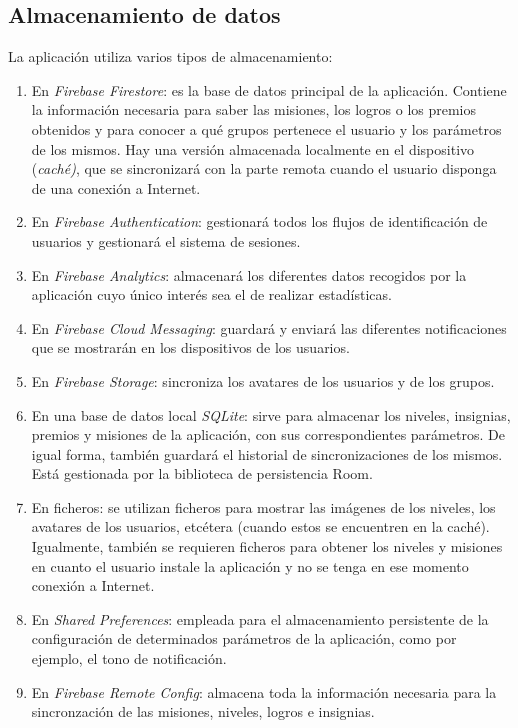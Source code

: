 \documentclass[twoside]{report}
\begin{document}

\subsection{Almacenamiento de datos}

La aplicación utiliza varios tipos de almacenamiento:
\begin{enumerate}
\item En \textit{Firebase Firestore}: es la base de datos principal de la aplicación. Contiene la información necesaria para saber las misiones, los logros o los premios obtenidos y para conocer a qué grupos pertenece el usuario y los parámetros de los mismos. Hay una versión almacenada localmente en el dispositivo (\textit{caché)}, que se sincronizará con la parte remota cuando el usuario disponga de una conexión a Internet.

\item En \textit{Firebase Authentication}: gestionará todos los flujos de identificación de usuarios y gestionará el sistema de sesiones.

\item En \textit{Firebase Analytics}: almacenará los diferentes datos recogidos por la aplicación cuyo único interés sea el de realizar estadísticas.

\item En \textit{Firebase Cloud Messaging}: guardará y enviará las diferentes notificaciones que se mostrarán en los dispositivos de los usuarios.

\item En \textit{Firebase Storage}: sincroniza los avatares de los usuarios y de los grupos.

\item En una base de datos local \textit{SQLite}: sirve para almacenar los niveles, insignias, premios y misiones de la aplicación, con sus correspondientes parámetros. De igual forma, también guardará el historial de sincronizaciones de los mismos. Está gestionada por \cite{roompersistence} la biblioteca de persistencia Room.

\item En ficheros: se utilizan ficheros para mostrar las imágenes de los niveles, los avatares de los usuarios, etcétera (cuando estos se encuentren en la caché). Igualmente, también se requieren ficheros para obtener los niveles y misiones en cuanto el usuario instale la aplicación y no se tenga en ese momento conexión a Internet.

\item En \textit{Shared Preferences}: empleada para el almacenamiento persistente de la configuración de determinados parámetros de la aplicación, como por ejemplo, el tono de notificación.

\item En \textit{Firebase Remote Config}: almacena toda la información necesaria para la sincronzación de las misiones, niveles, logros e insignias. 
\end{enumerate}
\end{document}
